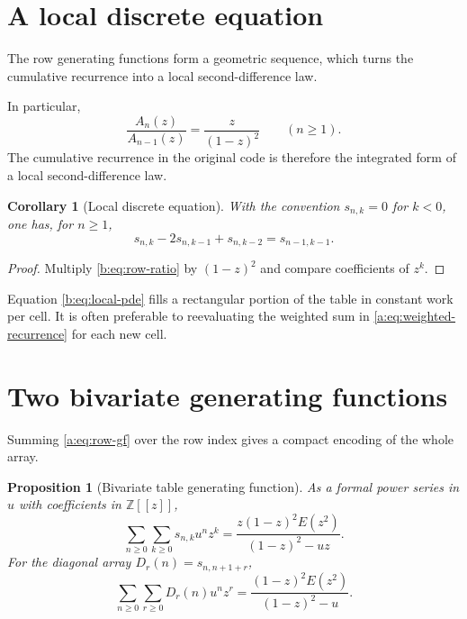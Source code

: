\documentclass[11pt,a4paper,oneside,openany]{book}
\numberwithin{equation}{chapter}
\newtheorem{proposition}[theorem]{Proposition}
\newtheorem{corollary}[theorem]{Corollary}
\theoremstyle{definition}
\theoremstyle{remark}
\newcommand{\Z}{\mathbb Z}
\newcommand{\Diag}{D}
\begin{document}
\section{A local discrete equation}
The row generating functions form a geometric sequence, which turns the
cumulative recurrence into a local second-difference law.

In particular,
\begin{equation}
 \frac{A_n(z)}{A_{n-1}(z)}=\frac{z}{(1-z)^2}
 \qquad(n\ge1).
 \label{b:eq:row-ratio}
\end{equation}
The cumulative recurrence in the original code is therefore the integrated
form of a local second-difference law.

\begin{corollary}[Local discrete equation]
\label{b:cor:local-pde}
With the convention $s_{n,k}=0$ for $k<0$, one has, for $n\ge1$,
\begin{equation}
 s_{n,k}-2s_{n,k-1}+s_{n,k-2}=s_{n-1,k-1}.
 \label{b:eq:local-pde}
\end{equation}
\end{corollary}

\begin{proof}
Multiply \eqref{b:eq:row-ratio} by $(1-z)^2$ and compare coefficients of
$z^k$.
\end{proof}

Equation \eqref{b:eq:local-pde} fills a rectangular portion of the table in
constant work per cell.  It is often preferable to reevaluating the weighted
sum in \eqref{a:eq:weighted-recurrence} for each new cell.
\section{Two bivariate generating functions}

Summing \eqref{a:eq:row-gf} over the row index gives a compact encoding of the
whole array.

\begin{proposition}[Bivariate table generating function]
As a formal power series in \(u\) with coefficients in \(\Z[[z]]\),
\begin{equation}
 \boxed{
 \sum_{n\ge0}\sum_{k\ge0}s_{n,k}u^nz^k
 =\frac{z(1-z)^2E(z^2)}{(1-z)^2-uz}.}
 \label{a:eq:bivariate-table}
\end{equation}
For the diagonal array \(\Diag_r(n)=s_{n,n+1+r}\),
\begin{equation}
 \boxed{
 \sum_{n\ge0}\sum_{r\ge0}\Diag_r(n)u^nz^r
 =\frac{(1-z)^2E(z^2)}{(1-z)^2-u}.}
 \label{a:eq:bivariate-diagonal}
\end{equation}
\end{proposition}
\end{document}
